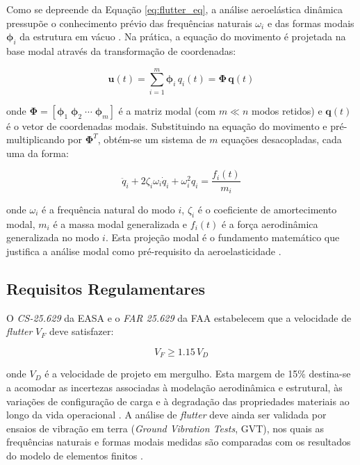\documentclass[11pt,oneside,a4paper,final]{report}
\begin{document}
Como se depreende da Equação \eqref{eq:flutter_eq}, a análise aeroelástica dinâmica pressupõe o conhecimento prévio das frequências naturais $\omega_i$ e das formas modais $\boldsymbol{\phi}_i$ da estrutura em vácuo \cite{Craig2006}. Na prática, a equação do movimento é projetada na base modal através da transformação de coordenadas:

\begin{equation}
    \mathbf{u}(t) = \sum_{i=1}^{m} \boldsymbol{\phi}_i \, 
    q_i(t) = \boldsymbol{\Phi} \, \mathbf{q}(t)
    \label{eq:modal_transform}
\end{equation}

\noindent onde $\boldsymbol{\Phi} = [\boldsymbol{\phi}_1 \; \boldsymbol{\phi}_2 \; \cdots \; \boldsymbol{\phi}_m]$ é a matriz modal (com $m \ll n$ modos retidos) e $\mathbf{q}(t)$ é o vetor de coordenadas modais. Substituindo na equação do movimento e pré-multiplicando por $\boldsymbol{\Phi}^T$, obtém-se um sistema de $m$ equações desacopladas, cada uma da forma:

\begin{equation}
    \ddot{q}_i + 2\zeta_i \omega_i \dot{q}_i + 
    \omega_i^2 q_i = \frac{f_i(t)}{m_i}
    \label{eq:modal_eq}
\end{equation}

\noindent onde $\omega_i$ é a frequência natural do modo $i$, $\zeta_i$ é o coeficiente de amortecimento modal, $m_i$ é a massa modal generalizada e $f_i(t)$ é a força aerodinâmica generalizada no modo $i$. Esta projeção modal é o fundamento matemático que justifica a análise modal como pré-requisito da aeroelasticidade \cite{Craig2006}.

\subsection{Requisitos Regulamentares}

O \textit{CS-25.629} da EASA \cite{EASA2022} e o \textit{FAR 25.629} da FAA \cite{FAA2023} estabelecem que a velocidade de \textit{flutter} $V_F$ deve satisfazer:

\begin{equation}
    V_F \geq 1.15 \, V_D
    \label{eq:flutter_margin}
\end{equation}

\noindent onde $V_D$ é a velocidade de projeto em mergulho. Esta margem de 15\% destina-se a acomodar as incertezas associadas à modelação aerodinâmica e estrutural, às variações de configuração de carga e à degradação das propriedades materiais ao longo da vida operacional \cite{Wright2015}. A análise de \textit{flutter} deve ainda ser validada por ensaios de vibração em terra (\textit{Ground Vibration Tests}, GVT), nos quais as frequências naturais e formas modais medidas são comparadas com os resultados do modelo de elementos finitos \cite{Ewins2000}.
\end{document}
